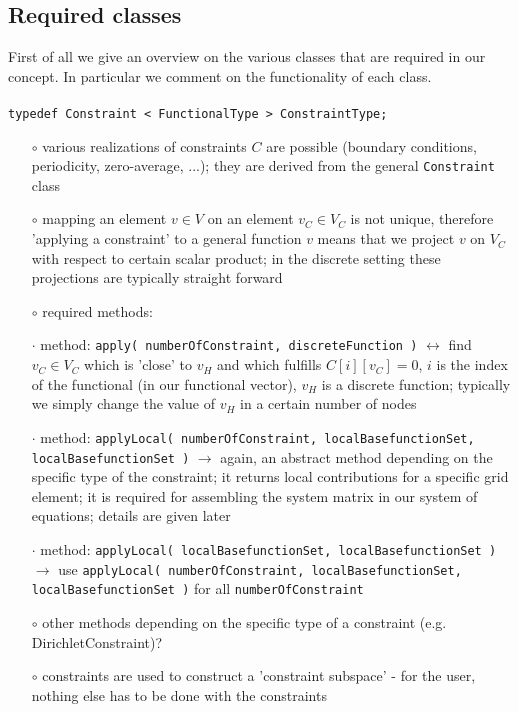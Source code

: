 \documentclass[a4paper,11pt]{article}
\numberwithin{equation}{section}
\newcommand{\CodeT}[1]{\textnormal{\texttt{#1}}}
\begin{document}
\subsection{Required classes}

First of all we give an overview on the various classes that are required in our concept. In particular we comment on the functionality of each class.\\
\\
\noindent\CodeT{typedef Constraint < FunctionalType > ConstraintType;}
\begin{itemize}
	\item[$\circ$] various realizations of constraints $C$ are possible (boundary conditions, periodicity, zero-average, ...); they are derived from the general \CodeT{Constraint} class
	\item[$\circ$] mapping an element $v\in V$ on an element $v_C \in V_C$ is not unique, therefore 'applying a constraint' to a general function $v$ means that we project $v$ on $V_C$ with respect to certain scalar product; in the discrete setting these projections are typically straight forward
	\item[$\circ$] required methods:
	\item[$\cdot$] method: \CodeT{apply( numberOfConstraint, discreteFunction )} $\leftrightarrow$ find $v_C \in V_C$ which is 'close' to $v_H$ and which fulfills $C[i][v_C]=0$, $i$ is the index of the functional (in our functional vector), $v_H$ is a discrete function; typically we simply change the value of $v_H$ in a certain number of nodes
	\item[$\cdot$] method: \CodeT{applyLocal( numberOfConstraint, localBasefunctionSet, \\ localBasefunctionSet )} $\rightarrow$ again, an abstract method depending on the specific type of the constraint; it returns local contributions for a specific grid element; it is required for assembling the system matrix in our system of equations; details are given later
	\item[$\cdot$] method: \CodeT{applyLocal( localBasefunctionSet, localBasefunctionSet )} $\rightarrow$ use \CodeT{applyLocal( numberOfConstraint, localBasefunctionSet, \\ localBasefunctionSet )} for all \CodeT{numberOfConstraint}
	\item[$\circ$] other methods depending on the specific type of a constraint (e.g. DirichletConstraint)?
	\item[$\circ$] constraints are used to construct a 'constraint subspace' - for the user, nothing else has to be done with the constraints
\end{itemize}
\end{document}
